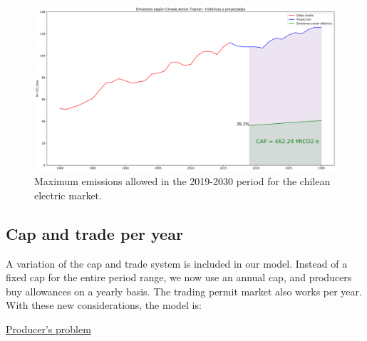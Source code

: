 \documentclass[11pt, letterpaper]{article}
\newcommand{\fel}[1]{{\color{red}({\bf FF:}#1)}}
\begin{document}




\begin{figure}[ht!]
 \includegraphics[width=\textwidth]{Apuntes/Figures/cap.png}
 \caption{Maximum emissions allowed in the 2019-2030 period for the chilean electric market. }
  \label{fig:cap}
  \end{figure}

\subsection{Cap and trade per year}

A variation of the cap and trade system is included in our model. Instead of a fixed cap for the entire period range, we now use an annual cap, and producers buy allowances on a yearly basis. The trading permit market also works per year. With these new considerations, the model is:

\underline{Producer's problem}
\end{document}
